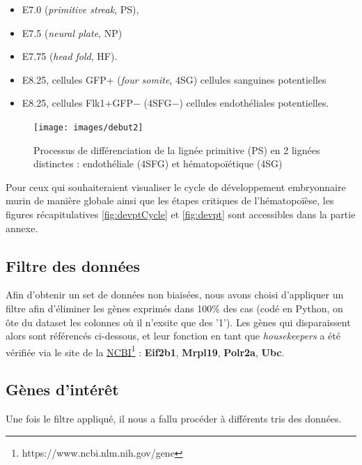 \documentclass[fleqn,11pt]{SelfArx} %
\begin{document}
\begin{itemize}
\item E7.0 (\textit{primitive streak}, PS),
\item E7.5 (\textit{neural plate}, NP) 
\item E7.75 (\textit{head fold}, HF).
\item E8.25, cellules GFP+ (\textit{four somite}, 4SG) cellules sanguines potentielles
\item E8.25, cellules Flk1+GFP− (4SFG−) cellules endothéliales potentielles.
\end{itemize}



\begin{figure}[ht]
\centering
\texttt{[image: images/debut2]}
\caption{Processus de différenciation de la lignée primitive (PS) en 2 lignées distinctes : endothéliale (4SFG) et hématopoïétique (4SG)}
\label{fig:debut}
\end{figure}

Pour ceux qui souhaiteraient visualiser le cycle de développement embryonnaire murin de manière globale ainsi que les étapes critiques de l'hématopoïèse, les figures récapitulatives \ref{fig:devptCycle} et \ref{fig:devpt} sont accessibles dans la partie annexe. 



\subsection{Filtre des données}
Afin d'obtenir un set de données non biaisées, nous avons choisi d'appliquer un filtre afin d'éliminer les gènes exprimés dans 100\% des cas (codé en Python, on ôte du dataset les colonnes où il n'exsite que des '1'). Les gènes qui disparaissent alors sont référencés ci-dessous, et leur fonction en tant que \textit{housekeepers} a été vérifiée via le site de la \href{https://www.ncbi.nlm.nih.gov/gene}{NCBI}\footnote{https://www.ncbi.nlm.nih.gov/gene} : \textbf{Eif2b1}, \textbf{Mrpl19}, \textbf{Polr2a}, \textbf{Ubc}.


\subsection{Gènes d'intérêt}
Une fois le filtre appliqué, il nous a fallu procéder à différents tris des données. 
\end{document}
